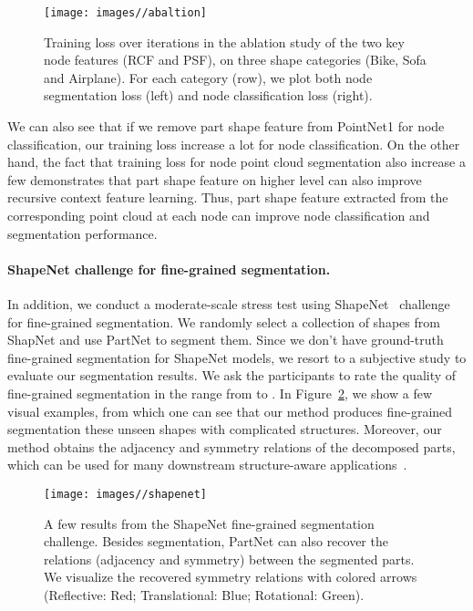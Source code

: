 \begin{figure}[t]
  \centering
  \texttt{[image: images//abaltion]}
  \caption{Training loss over iterations in the ablation study of the two key node features (RCF and PSF), on three shape categories (Bike, Sofa and Airplane). For each category (row), we plot both node segmentation loss (left) and node classification loss (right).}
  \label{abalation_figure}
\end{figure}

We can also see that if we remove part shape feature from PointNet1 for node classification, our training loss increase a lot for node classification. On the other hand, the fact that training loss for node point cloud segmentation also increase a few demonstrates that part shape feature on higher level can also improve recursive context feature learning. Thus, part shape feature extracted from the corresponding point cloud at each node can improve node classification and segmentation performance.
\fi





\paragraph{ShapeNet challenge for fine-grained segmentation.}
In addition, we conduct a moderate-scale stress test using ShapeNet~\cite{Shapenet} challenge for fine-grained segmentation. We randomly select a collection of shapes from ShapNet and use PartNet to segment them.
Since we don't have ground-truth fine-grained segmentation for ShapeNet models, we resort to a subjective study to evaluate our segmentation results. We ask the participants to rate the quality of fine-grained segmentation in the range from  to .   In Figure~\ref{shapenet}, we show a few visual examples, from which one can see that our method produces fine-grained segmentation these unseen shapes with complicated structures. Moreover, our method obtains the adjacency and symmetry relations of the decomposed parts, which can be used for many downstream structure-aware applications~\cite{mitra2013structure}.




\begin{figure}[t]
  \centering
  \texttt{[image: images//shapenet]}
  \caption{A few results from the ShapeNet fine-grained segmentation challenge. Besides segmentation, PartNet can also recover the relations (adjacency and symmetry) between the segmented parts. We visualize the recovered symmetry relations with colored arrows (Reflective: Red; Translational: Blue; Rotational: Green).}
  \label{shapenet}\vspace{-8pt}
\end{figure}


